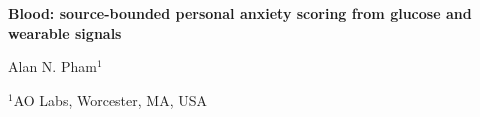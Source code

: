 \documentclass[12pt,letterpaper]{article}
\begin{document}
\linenumbers
\thispagestyle{empty}

\begin{center}
    \vspace*{-0.6em}

    {\fontsize{20}{22}\selectfont\bfseries\color{SumiInk}
    Blood: source-bounded personal anxiety scoring from glucose and wearable signals\par}

    \vspace{0.95em}

    {\normalsize\color{SumiInk}
    Alan N. Pham$^{1}$\par}

    \vspace{0.38em}

    {\small\color{DustyTaupe}
    $^{1}$AO Labs, Worcester, MA, USA\par}
\end{center}
\end{document}
